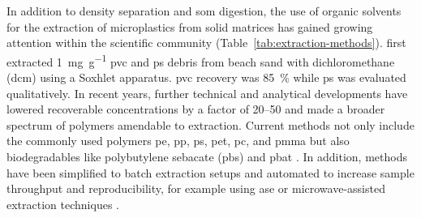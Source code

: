 In addition to density separation and \ac{som} digestion, the use of organic solvents for the extraction of microplastics from solid matrices has gained growing attention within the scientific community
(Table~\ref{tab:extraction-methods}). \citet{FabbriAnalysis2000} first extracted \SI{1}{\milli\gram\per\gram} \ac{pvc} and \ac{ps} debris from beach sand with dichloromethane (\ac{dcm}) using a Soxhlet apparatus.
\Ac{pvc} recovery was \SI{85}{\percent} while \ac{ps} was evaluated qualitatively. In recent years, further technical and analytical developments have lowered recoverable concentrations by a factor of 20--50 \citep[Chapter~\ref{ch:py-gc-ms-method};][]{PeezQuantitative2019,DierkesQuantification2019} and made a broader spectrum of polymers amendable to extraction. Current methods not only include the commonly used polymers \ac{pe}, \ac{pp}, \ac{ps}, \ac{pet}, \ac{pc}, and \ac{pmma} \citep{FullerProcedure2016,OkoffoIdentification2020} but also biodegradables like polybutylene sebacate (\ac{pbs}) and \ac{pbat} \citep{SiottoMonitoring2013,NelsonQuantification2019}.
In addition, methods have been simplified to batch extraction setups \citep[Chapter~\ref{ch:py-gc-ms-method};][]{ElertComparison2017} and automated to increase sample throughput and reproducibility, for example using \ac{ase} \citep{FullerProcedure2016,OkoffoIdentification2020} or microwave-assisted extraction techniques \citep{LaNasaMicrowaveassisted2020}.

